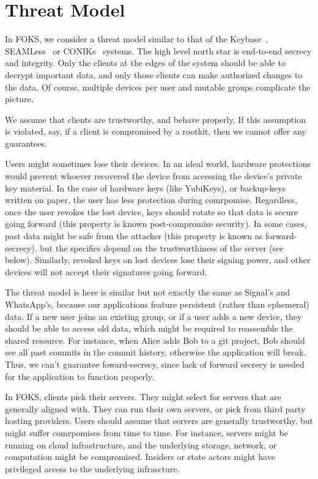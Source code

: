 
\section{Threat Model}
\label{sec:threatmodel}

In FOKS, we consider a threat model similar to that of the Keybase~\cite{keybase},
SEAMLess~\cite{chase2019seemless} or CONIKs~\cite{melara2015coniks} systems.
The high level north star is end-to-end secrecy and integrity. Only the clients
at the edges of the system should be able to decrypt important data, and only
those clients can make authorized changes to the data. Of course, multiple
devices per user and mutable groups complicate the picture.

We assume that clients are trustworthy, and behave properly. If this assumption
is violated, say, if a client is compromised by a rootkit, then we cannot
offer any guarantees. 

Users might sometimes lose their devices. In an ideal world, hardware protections
would prevent whoever recovered the device from accessing the device's private
key material. In the case of hardware keys (like YubiKeys), or backup-keys
written on paper, the user has less protection during comrpomise. Regardless,
once the user revokes the lost device, keys should rotate so that data is secure
going forward (this property is known post-compromise security). In some cases,
past data might be safe from the attacker (this property is known as forward-secrecy).
but the specifics depend on the trustworthiness of the server (see below). Similarly, revoked
keys on lost devices lose their signing power, and other devices will not accept
their signatures going forward.

The threat model is here is similar but not exactly the same as Signal's and
WhatsApp's, because our applications feature persistent (rather than ephemeral)
data. If a new user joins an existing group, or if a user adds a new device,
they should be able to access old data, which might be required to reassemble the
shared resource. For instance, when Alice adds Bob to a git project, Bob
should see all past commits in the commit history, otherwise the
application will break. Thus, we can't guarantee foward-secrecy, since
lack of forward secrecy is needed for the application to function properly.

In FOKS, clients pick their servers. They might select for servers
that are generally aligned with. They can run their own servers, or pick 
from third party hosting providers. Users should assume that servers
are generally trustworthy, but might suffer comrpomises from time to time.
For instance, servers might be running on cloud infrastructure, and the underlying
storage, network, or computation might be compromised. Insiders or state actors
might have privileged access to the underlying infrascture. 

